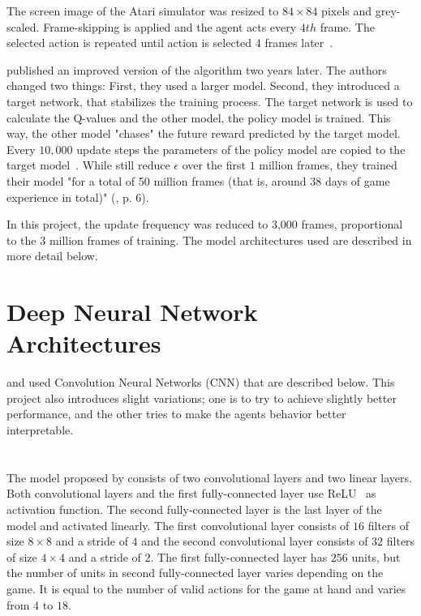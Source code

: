 The screen image of the Atari simulator was resized to $84 \times 84$ pixels and grey-scaled. Frame-skipping is applied and the agent acts every $4th$ frame. The selected action is repeated until action is selected $4$ frames later~\parencite{mnih_playing_2013}.

\textcite{mnih_human-level_2015} published an improved version of the algorithm two years later. The authors changed two things: First, they used a larger model. Second, they introduced a target network, that stabilizes the training process. The target network is used to calculate the Q-values and the other model, the policy model is trained. This way, the other model "chases" the future reward predicted by the target model. Every $10,000$ update steps the parameters of the policy model are copied to the target model~\parencite{mnih_human-level_2015}. While \textcite{mnih_human-level_2015} still reduce $\epsilon$ over the first $1$ million frames, they trained their model "for a total of 50 million frames (that is, around 38 days of game experience in total)" (\parencite{mnih_human-level_2015}, p. 6).

In this project, the update frequency was reduced to 3,000 frames, proportional to the $3$ million frames of training. The model architectures used are described in more detail below.

\section{Deep Neural Network Architectures}

\textcite{mnih_playing_2013} and \textcite{mnih_human-level_2015} used Convolution Neural Networks (CNN) that are  described below. This project also introduces slight variations; one is to try to achieve slightly better performance, and the other tries to make the agents behavior better interpretable.

\section{\textcite{mnih_playing_2013}}

The model proposed by \textcite{mnih_playing_2013} consists of two convolutional layers and two linear layers. Both convolutional layers and the first fully-connected layer use ReLU~\parencite{hahnloser_digital_2000} as activation function. The second fully-connected layer is the last layer of the model and activated linearly. The first convolutional layer consists of $16$ filters of size $8 \times 8$ and a stride of $4$ and the second convolutional layer consists of $32$ filters of size $4 \times 4$ and a stride of $2$. The first fully-connected layer has $256$ units, but the number of units in second fully-connected layer varies depending on the game. It is equal to the number of valid actions for the game at hand and varies from $4$ to $18$.

